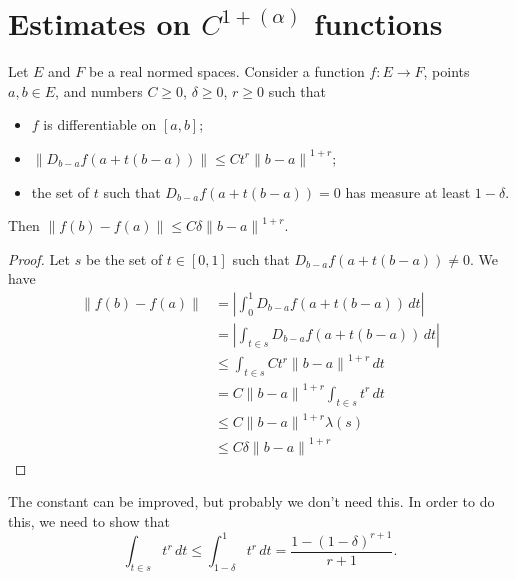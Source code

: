 \section{Estimates on \(C^{1+(\alpha)}\) functions}

\begin{lemma}%
  \label{lem:cdh-at-sub-affine-le-of-meas}
  Let \(E\) and \(F\) be a real normed spaces.
  Consider a function \(f\colon E\to F\), points \(a, b \in E\),
  and numbers \(C\ge 0\), \(\delta\ge 0\), \(r \ge 0\) such that
  \begin{itemize}
  \item \(f\) is differentiable on \([a, b]\);
  \item \(\|D_{b - a}f(a + t(b - a))\| \le Ct^{r}{\|b - a\|}^{1+r}\);
  \item the set of \(t\) such that \(D_{b - a}f(a + t(b - a)) = 0\)
    has measure at least \(1 - \delta\).
  \end{itemize}
  Then \(\|f(b) - f(a)\| \le C\delta{\|b - a\|}^{1+r}\).
\end{lemma}

\begin{proof}
  Let \(s\) be the set of \(t \in [0, 1]\) such that \(D_{b - a}f(a + t(b - a)) \ne 0\).
  We have
  \begin{align*}
    \|f(b) - f(a)\| &= \left|\int_{0}^{1} D_{b - a}f(a + t(b - a))\,dt\right| \\
                    &= \left|\int_{t\in s} D_{b - a}f(a + t(b - a))\,dt\right| \\
                    &\le \int_{t \in s} Ct^{r}{\|b - a\|}^{1+r}\,dt \\
                    &= C{\|b - a\|}^{1+r} \int_{t \in s}t^{r}\,dt \\
                    &\le C{\|b - a\|}^{1+r} \lambda(s) \\
                    &\le C\delta {\|b - a\|}^{1+r}
  \end{align*}
\end{proof}

\begin{remark}
  The constant can be improved, but probably we don't need this.
  In order to do this, we need to show that
  \[
    \int_{t \in s}t^{r}\,dt \le \int_{1 - \delta}^{1} t^{r}\,dt = \frac{1 - {(1 - \delta)}^{r + 1}}{r + 1}.
  \]
\end{remark}

